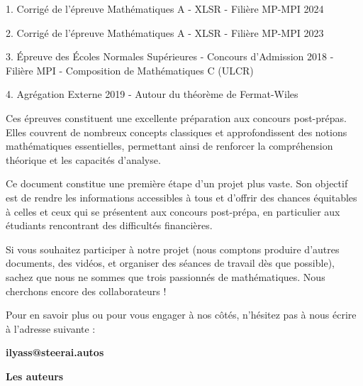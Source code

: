 \documentclass[a4paper,11pt]{article}
\begin{document}
1. Corrig{\'e} de l'{\'e}preuve Math{\'e}matiques A - XLSR -
Fili{\`e}re MP-MPI 2024

2. Corrig{\'e} de l'{\'e}preuve Math{\'e}matiques A - XLSR - Fili{\`e}re
MP-MPI 2023

3. {\'E}preuve des {\'E}coles Normales Sup{\'e}rieures - Concours d'Admission
2018 - Fili{\`e}re MPI - Composition de Math{\'e}matiques C (ULCR)

4. Agr{\'e}gation Externe 2019 - Autour du th{\'e}or{\`e}me de Fermat-Wiles

Ces {\'e}preuves constituent une excellente pr{\'e}paration aux concours
post-pr{\'e}pas. Elles couvrent de nombreux concepts classiques et
approfondissent des notions math{\'e}matiques essentielles, permettant ainsi
de renforcer la compr{\'e}hension th{\'e}orique et les capacit{\'e}s
d'analyse.
\newpage

\newpage

\newpage

\newpage






\newpage
\vspace*{\fill} %

\begin{center}
  \begin{minipage}{0.85\textwidth}
    \centering


    \vspace{1em}

    Ce document constitue une première étape d’un projet plus vaste. Son objectif est de rendre les informations accessibles à tous et d’offrir des chances équitables à celles et ceux qui se présentent aux concours post-prépa, en particulier aux étudiants rencontrant des difficultés financières.

    Si vous souhaitez participer à notre projet (nous comptons produire d’autres documents, des vidéos, et organiser des séances de travail dès que possible), sachez que nous ne sommes que trois passionnés de mathématiques. Nous cherchons encore des collaborateurs !

    Pour en savoir plus ou pour vous engager à nos côtés, n’hésitez pas à nous écrire à l’adresse suivante :

    \vspace{1em}
    \textbf{ilyass@steerai.autos}

    \vspace{2em}
    \begin{flushright}
      \textbf{Les auteurs}
    \end{flushright}
    \vspace{1em}


  \end{minipage}
\end{center}

\vspace*{\fill}
\end{document}
